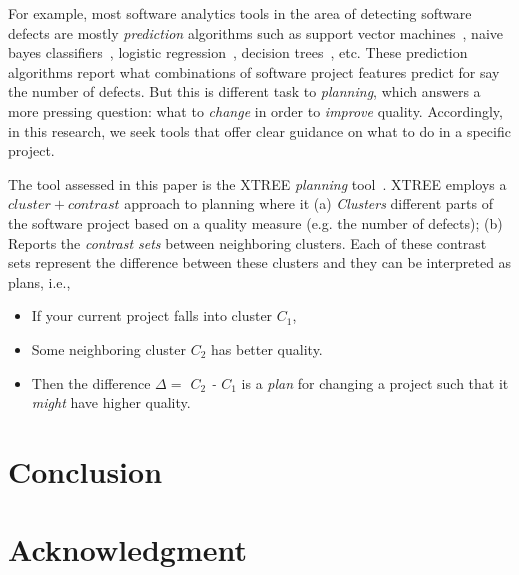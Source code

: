 \documentclass[conference]{IEEEtran}
\begin{document}
For example, most software analytics tools in the area of detecting software defects are mostly \textit{prediction} algorithms such as support vector machines~\cite{cortes95}, naive bayes classifiers~\cite{lessmann08}, logistic regression~\cite{lessmann08}, decision trees~\cite{dtrees}, etc. These prediction algorithms report what combinations of software project features predict for say the number of defects. But this is different task to \textit{planning}, which answers a more pressing question: what to {\em change} in order to {\em improve} quality. Accordingly, in this research, we seek tools that offer clear guidance on what to do in a specific project.

The tool assessed in this paper is the XTREE \textit{planning} tool~\cite{krishna17a}. XTREE employs a $cluster+contrast$ approach to planning where it (a) \textit{Clusters} different parts of the software project based on a quality measure (e.g. the number of defects); (b) Reports the \textit{contrast sets} between neighboring clusters. Each of these contrast sets represent the difference between these clusters and they can  be interpreted as plans, i.e., 
\begin{itemize}
	    \item If your current project falls into cluster $C_1$,
	    \item Some neighboring cluster $C_2$ has better quality.
	    \item Then the difference {\em $\Delta=$ $C_2$ - $C_1$} is a {\em plan} for changing a  project such that it \textit{might} have   higher quality.
\end{itemize}


\section{Conclusion}

\section*{Acknowledgment}



\end{document}
